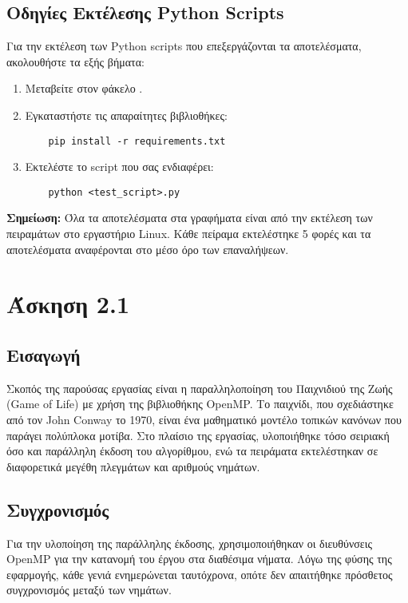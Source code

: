 \documentclass{article}
\begin{document}
\subsection*{Οδηγίες Εκτέλεσης Python Scripts}
Για την εκτέλεση των Python scripts που επεξεργάζονται τα αποτελέσματα, ακολουθήστε τα εξής βήματα:
\begin{enumerate}
    \item Μεταβείτε στον φάκελο .
    \item Εγκαταστήστε τις απαραίτητες βιβλιοθήκες:
    \begin{verbatim}
    pip install -r requirements.txt
    \end{verbatim}
    \item Εκτελέστε το script που σας ενδιαφέρει:
    \begin{verbatim}
    python <test_script>.py
    \end{verbatim}
\end{enumerate}
\textbf{Σημείωση:} Όλα τα αποτελέσματα στα γραφήματα είναι από την εκτέλεση των πειραμάτων στο εργαστήριο Linux. Κάθε πείραμα εκτελέστηκε 5 φορές και τα αποτελέσματα αναφέρονται στο μέσο όρο των επαναλήψεων.
\section*{Άσκηση 2.1}
\subsection*{Εισαγωγή}
Σκοπός της παρούσας εργασίας είναι η παραλληλοποίηση του Παιχνιδιού της Ζωής (Game of Life) με χρήση της βιβλιοθήκης OpenMP. Το παιχνίδι, που σχεδιάστηκε από τον John Conway το 1970, είναι ένα μαθηματικό μοντέλο τοπικών κανόνων που παράγει πολύπλοκα μοτίβα. Στο πλαίσιο της εργασίας, υλοποιήθηκε τόσο σειριακή όσο και παράλληλη έκδοση του αλγορίθμου, ενώ τα πειράματα εκτελέστηκαν σε διαφορετικά μεγέθη πλεγμάτων και αριθμούς νημάτων.

\subsection*{Συγχρονισμός}
Για την υλοποίηση της παράλληλης έκδοσης, χρησιμοποιήθηκαν οι διευθύνσεις OpenMP για την κατανομή του έργου στα διαθέσιμα νήματα. Λόγω της φύσης της εφαρμογής, κάθε γενιά ενημερώνεται ταυτόχρονα, οπότε δεν απαιτήθηκε πρόσθετος συγχρονισμός μεταξύ των νημάτων.
\end{document}

